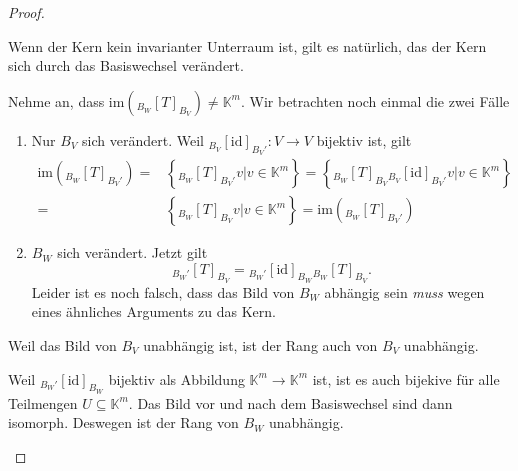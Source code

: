 \begin{proof}
\begin{parts}
\begin{enumerate}[label=(\roman*)]
				Wenn der Kern kein invarianter Unterraum ist, gilt es natürlich, das der Kern sich durch das Basiswechsel verändert.
		\end{enumerate}
	\item Nehme an, dass $\text{im}\left( {}_{B_W}[T]_{B_V} \right) \neq \mathbb{K}^m$. Wir betrachten noch einmal die zwei Fälle
		\begin{enumerate}[label=(\roman*)]
			\item Nur $B_V$ sich verändert. Weil $_{B_V}[\text{id}]_{B_V'}:V\to V$ bijektiv ist, gilt
	\begin{align*}
		\text{im}\left( {}_{B_W}[T]_{B_V'} \right) =&\left\{ {}_{B_W}[T]_{B_V'}v|v \in\mathbb{K}^m \right\}=\left\{ {}_{B_W}[T]_{B_V}{}_{B_V}[\text{id}]_{B_V'}v|v\in \mathbb{K}^m \right\} \\=&\left\{ {}_{B_W}[T]_{B_V}v|v\in\mathbb{K}^m \right\}=\text{im}\left( {}_{B_W}[T]_{B_V'} \right)  
				\end{align*}
			\item $B_W$ sich verändert. Jetzt gilt
				\[
					_{B_W'}[T]_{B_V}={}_{B_W'}[\text{id}]_{B_W}{}_{B_W}[T]_{B_V}
				.\] 
				Leider ist es noch falsch, dass das Bild von $B_W$ abhängig sein \emph{muss} wegen eines ähnliches Arguments zu das Kern.
		\end{enumerate}
	\item Weil das Bild von $B_V$ unabhängig ist, ist der Rang auch von $B_V$ unabhängig.

		Weil $_{B_W'}[\text{id}]_{B_W}$ bijektiv als Abbildung $\mathbb{K}^m\to \mathbb{K}^m$ ist, ist es auch bijekive f\"{u}r alle Teilmengen $U\subseteq \mathbb{K}^m$. Das Bild vor und nach dem Basiswechsel sind dann isomorph. Deswegen ist der Rang von $B_W$ unabhängig.
	\end{parts}
\end{proof}
